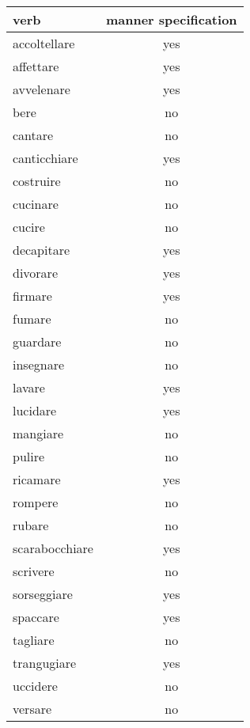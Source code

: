 \begin{longtable}{l|c}
\textbf{verb}     & \textbf{manner specification}    \\
\hline
\endhead
accoltellare   & yes      \\
affettare      & yes      \\
avvelenare     & yes      \\
bere           & no       \\
cantare        & no       \\
canticchiare   & yes      \\
costruire      & no       \\
cucinare       & no       \\
cucire         & no       \\
decapitare     & yes      \\
divorare       & yes      \\
firmare        & yes      \\
fumare         & no       \\
guardare       & no       \\
insegnare      & no       \\
lavare         & yes      \\
lucidare       & yes      \\
mangiare       & no       \\
pulire         & no       \\
ricamare       & yes      \\
rompere        & no       \\
rubare         & no       \\
scarabocchiare & yes      \\
scrivere       & no       \\
sorseggiare    & yes      \\
spaccare       & yes      \\
tagliare       & no       \\
trangugiare    & yes      \\
uccidere       & no       \\
versare        & no      
\end{longtable}
